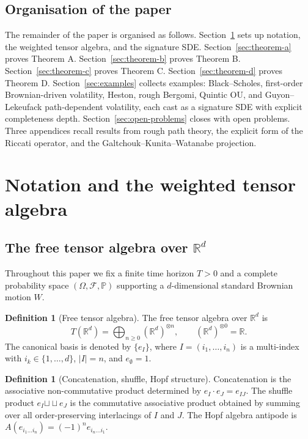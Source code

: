 \documentclass[11pt,oneside]{article}
\theoremstyle{plain}
\theoremstyle{definition}
\newtheorem{definition}[theorem]{Definition}
\theoremstyle{remark}
\newcommand{\R}{\mathbb{R}}
\newcommand{\Pp}{\mathbb{P}}
\newcommand{\F}{\mathcal{F}}
\newcommand{\sh}{\mathbin{\sqcup\!\sqcup}}
\begin{document}
\subsection{Organisation of the paper}

The remainder of the paper is organised as follows. Section~\ref{sec:notation} sets up notation, the weighted tensor algebra, and the signature SDE. Section~\ref{sec:theorem-a} proves Theorem A. Section~\ref{sec:theorem-b} proves Theorem B. Section~\ref{sec:theorem-c} proves Theorem C. Section~\ref{sec:theorem-d} proves Theorem D. Section~\ref{sec:examples} collects examples: Black--Scholes, first-order Brownian-driven volatility, Heston, rough Bergomi, Quintic OU, and Guyon--Lekeufack path-dependent volatility, each cast as a signature SDE with explicit completeness depth. Section~\ref{sec:open-problems} closes with open problems. Three appendices recall results from rough path theory, the explicit form of the Riccati operator, and the Galtchouk--Kunita--Watanabe projection.

\section{Notation and the weighted tensor algebra}\label{sec:notation}

\subsection{The free tensor algebra over $\R^d$}

Throughout this paper we fix a finite time horizon $T>0$ and a complete probability space $(\Omega,\F,\Pp)$ supporting a $d$-dimensional standard Brownian motion $W$.

\begin{definition}[Free tensor algebra]
The free tensor algebra over $\R^d$ is
\[
T(\R^d)=\bigoplus_{n\geq0}(\R^d)^{\otimes n}, \qquad (\R^d)^{\otimes0}=\R.
\]
The canonical basis is denoted by $\{e_I\}$, where $I=(i_1,\ldots,i_n)$ is a multi-index with $i_k\in\{1,\ldots,d\}$, $|I|=n$, and $e_\emptyset=1$.
\end{definition}

\begin{definition}[Concatenation, shuffle, Hopf structure]
Concatenation is the associative non-commutative product determined by $e_I\cdot e_J=e_{IJ}$. The shuffle product $e_I\sh e_J$ is the commutative associative product obtained by summing over all order-preserving interlacings of $I$ and $J$. The Hopf algebra antipode is $A(e_{i_1\ldots i_n})=(-1)^n e_{i_n\ldots i_1}$.
\end{definition}
\end{document}
